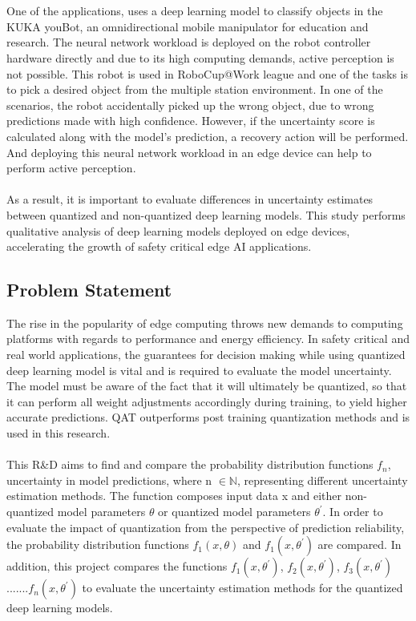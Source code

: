 \documentclass[rnd]{mas_proposal}
\begin{document}
\\\\
One of the applications, uses a deep learning model to classify objects in the KUKA youBot\cite{bischoff2011kuka}, an omnidirectional mobile manipulator for education and research. The neural network workload is deployed on the robot controller hardware directly and due to its high computing demands, active perception is not possible. This robot is used in RoboCup@Work league\cite{kraetzschmar2014robocup} and one of the tasks is to pick a desired object from the multiple station environment. In one of the scenarios, the robot accidentally picked up the wrong object, due to wrong predictions made with high confidence. However, if the uncertainty score is calculated along with the model's prediction, a recovery action will be performed. And deploying this neural network workload in an edge device can help to perform active perception.
\\\\
As a result, it is important to evaluate differences in uncertainty estimates between quantized and non-quantized deep learning models. This study performs qualitative analysis of deep learning models deployed on edge devices, accelerating the growth of safety critical edge AI applications. 

\subsection{Problem Statement}
The rise in the popularity of edge computing throws new demands to computing platforms with regards to performance and energy efficiency. In safety critical and real world applications\cite{mcallister2017concrete}, the guarantees for decision making while using quantized deep learning model is vital and is required to evaluate the model uncertainty. The model must be aware of the fact that it will ultimately be quantized, so that it can perform all weight adjustments accordingly during training, to yield higher accurate predictions. QAT outperforms post training quantization methods and is used in this research.
\\\\
This R\&D aims to find and compare the probability distribution functions $f_{n}$, uncertainty in model predictions, where n $\in \mathbb{N}$, representing different uncertainty estimation methods. The function composes input data x and either non-quantized model parameters $\theta$ or quantized model parameters $\theta^{\prime}$. In order to evaluate the impact of quantization from the perspective of prediction reliability, the probability distribution functions $f_{1}(x, \theta)$ and $f_{1}(x, \theta^{\prime})$ are compared. In addition, this project compares the functions $f_{1}(x, \theta^{\prime})$, $f_{2}(x, \theta^{\prime})$, $f_{3}(x, \theta^{\prime})$.......$f_{n}(x, \theta^{\prime})$ to evaluate the uncertainty estimation methods for the quantized deep learning models.
\end{document}

